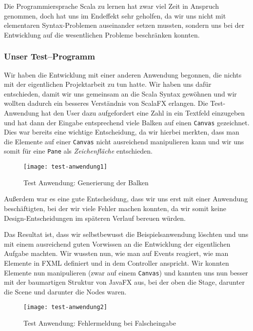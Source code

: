 Die Programmiersprache Scala zu lernen hat zwar viel Zeit in Anspruch genommen, doch hat uns im Endeffekt sehr geholfen, da wir uns nicht mit elementaren Syntax-Problemen auseinander setzen mussten, sondern uns bei der Entwicklung auf die wesentlichen Probleme beschränken konnten.

\subsubsection{Unser Test--Programm}
Wir haben die Entwicklung mit einer anderen Anwendung begonnen, die nichts mit der eigentlichen Projektarbeit zu tun hatte. Wir haben uns dafür entschieden, damit wir uns gemeinsam an die Scala Syntax gewöhnen und wir wollten dadurch ein besseres Verständnis von ScalaFX erlangen. Die Test-Anwendung hat den User dazu aufgefordert eine Zahl in ein Textfeld einzugeben und hat dann der Eingabe entsprechend viele Balken auf einen \texttt{Canvas} gezeichnet. Dies war bereits eine wichtige Entscheidung, da wir hierbei merkten, dass man die Elemente auf einer \texttt{Canvas} nicht ausreichend manipulieren kann und wir uns somit für eine \texttt{Pane} als \textit{Zeichenfläche} entschieden.

\begin{figure}[!htb]
    \centering
      \texttt{[image: test-anwendung1]}
    \caption{Test Anwendung: Generierung der Balken}
\end{figure}

Außerdem war es eine gute Entscheidung, dass wir uns erst mit einer Anwendung beschäftigten, bei der wir viele Fehler machen konnten, da wir somit keine Design-Entscheidungen im späteren Verlauf bereuen würden.

Das Resultat ist, dass wir selbstbewusst die Beispielsanwendung löschten und uns mit einem ausreichend guten Vorwissen an die Entwicklung der eigentlichen Aufgabe machten. Wir wussten nun, wie man auf Events reagiert, wie man Elemente in FXML definiert und in dem Controller anspricht. Wir konnten Elemente nun manipulieren (zwar auf einem \texttt{Canvas}) und kannten uns nun besser mit der baumartigen Struktur von JavaFX aus, bei der oben die Stage, darunter die Scene und darunter die Nodes waren.

\begin{figure}[!htb]
    \centering
      \texttt{[image: test-anwendung2]}
    \caption{Test Anwendung: Fehlermeldung bei Falscheingabe}
\end{figure}


